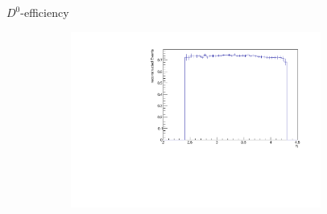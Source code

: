 \documentclass[11pt]{beamer}
\begin{document}
\begin{frame}{$D^0$-efficiency}
\begin{figure}
\begin{subfigure}{0.45\textwidth}
\end{subfigure}
\begin{subfigure}{0.45\textwidth}
\includegraphics[width=0.9\textwidth]{up_pdf/neg/h_eta_reco_D0_neg.pdf}
\end{subfigure}
\end{figure}
\end{frame}
\end{document}
